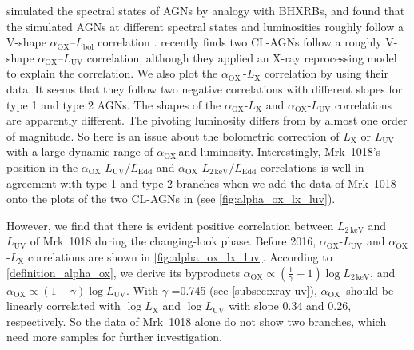 \documentclass[twocolumn]{aastex63}
\newcommand{\alphaox}{$\alpha_\mathrm{OX}$}
\begin{document}
\citet{2011MNRAS.413.2259S} simulated the spectral states of AGNs by analogy with BHXRBs, and found that the simulated AGNs at different spectral states and luminosities roughly follow a V-shape \alphaox--$L_\mathrm{bol}$ correlation \citep[see also in ][]{2019ApJ...883...76R}. \citet{2019arXiv190904676R} recently finds two CL-AGNs follow a roughly V-shape \alphaox--$L_\mathrm{UV}$ correlation, although they applied an X-ray reprocessing model to explain the correlation. We also plot the \alphaox\,-$L_\mathrm{X}$ correlation by using their data. It seems that they follow two negative correlations with different slopes for type 1 and type 2 AGNs. The shapes of the \alphaox-$L_\mathrm{X}$ and \alphaox-$L_\mathrm{UV}$ correlations are apparently different. The pivoting luminosity differs from \citet{2011ApJ...739...64X} by almost one order of magnitude. So here is an issue about the bolometric correction of $L_\mathrm{X}$ or $L_\mathrm{UV}$ with a large dynamic range of \alphaox \,and luminosity. Interestingly, Mrk~1018's position in the \alphaox-$L_\mathrm{UV}/L_\mathrm{Edd}$ and \alphaox-$L_\mathrm{2\,keV}/L_\mathrm{Edd}$ correlations is well in agreement with type 1 and type 2 branches when we add the data of Mrk~1018 onto the plots of the two CL-AGNs in \citet{2019arXiv190904676R} (see \autoref{fig:alpha_ox_lx_luv}).

However, we find that there is evident positive correlation between $L_\mathrm{2\,keV}$ and $L_\mathrm{UV}$ of Mrk~1018 during the changing-look phase. Before 2016, \alphaox-$L_\mathrm{UV}$ and \alphaox-$L_\mathrm{X}$ correlations are shown in \autoref{fig:alpha_ox_lx_luv}. According to \autoref{definition_alpha_ox}, we derive its byproducts \alphaox $\propto (\frac{1}{\gamma}-1) \log L_\mathrm{2\,keV}$, and \alphaox $\propto (1-\gamma) \log L_\mathrm{UV}$. With $\gamma$ =0.745 (see \autoref{subsec:xray-uv}), \alphaox\, should be linearly correlated with $\log L_\mathrm{X}$ and $\log L_\mathrm{UV}$ with slope 0.34 and 0.26, respectively. So the data of Mrk~1018 alone do not show two branches, which need more samples for further investigation. 



 

\end{document}
